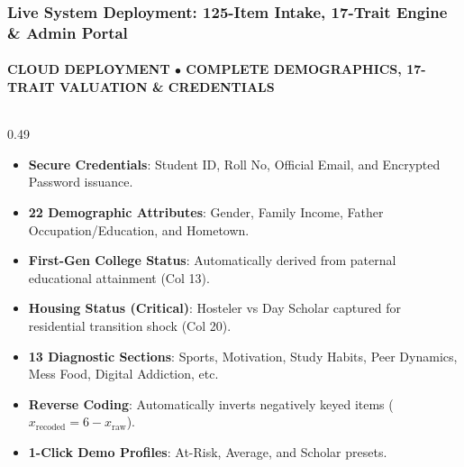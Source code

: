 \documentclass[aspectratio=169, 10pt]{beamer}
\begin{document}
\begin{frame}[t]
  \frametitle{Live System Deployment: 125-Item Intake, 17-Trait Engine \& Admin Portal}
  \framesubtitle{CLOUD DEPLOYMENT $\bullet$ COMPLETE DEMOGRAPHICS, 17-TRAIT VALUATION \& CREDENTIALS}
  \vspace{-0.2cm}
  \begin{columns}[T]
    \begin{column}{0.49\textwidth}
      \begin{tcolorbox}[colback=white, colframe=BlueDeep, arc=1.2mm, boxrule=0.8pt, title={\scriptsize\bfseries\color{white}1. Demographics \& Login Intake (Cols 1--22)}, colbacktitle=BlueDeep]
        \fontsize{5.0pt}{6.0pt}\selectfont
        \begin{itemize}\setlength{\itemsep}{2pt}
          \item \textbf{Secure Credentials}: Student ID, Roll No, Official Email, and Encrypted Password issuance.
          \item \textbf{22 Demographic Attributes}: Gender, Family Income, Father Occupation/Education, and Hometown.
          \item \textbf{First-Gen College Status}: Automatically derived from paternal educational attainment (Col 13).
          \item \textbf{Housing Status (Critical)}: Hosteler vs Day Scholar captured for residential transition shock (Col 20).
        \end{itemize}
      \end{tcolorbox}
      \vspace{1mm}
      \begin{tcolorbox}[colback=white, colframe=BluePrimary, arc=1.2mm, boxrule=0.8pt, title={\scriptsize\bfseries\color{white}2. 103-Item Diagnostic Survey (Cols 23--125)}, colbacktitle=BluePrimary]
        \fontsize{5.0pt}{6.0pt}\selectfont
        \begin{itemize}\setlength{\itemsep}{2pt}
          \item \textbf{13 Diagnostic Sections}: Sports, Motivation, Study Habits, Peer Dynamics, Mess Food, Digital Addiction, etc.
          \item \textbf{Reverse Coding}: Automatically inverts negatively keyed items ($x_{\text{recoded}} = 6 - x_{\text{raw}}$).
          \item \textbf{1-Click Demo Profiles}: At-Risk, Average, and Scholar presets.
        \end{itemize}
      \end{tcolorbox}
    \end{column}


\end{columns}
\end{frame}
\end{document}

